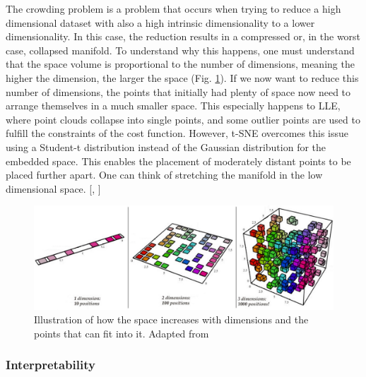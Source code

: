 The crowding problem is a problem that occurs when trying to reduce a high dimensional dataset with 
also a high intrinsic dimensionality to a lower dimensionality. In this case, the reduction results in a compressed or, in the worst case, collapsed manifold. To understand why this happens, one must understand that the space volume is proportional to the number of dimensions, meaning the higher the dimension, the larger the space (Fig. \ref{fig:crowding_problem}). If we now want to reduce this number of dimensions, the points that initially had plenty of space now need to arrange themselves in a much smaller space. This especially happens to LLE, where point clouds collapse into single points, and some outlier points are used to fulfill the constraints of the cost function. However, t-SNE overcomes this issue using a Student-t distribution instead of the Gaussian distribution for the embedded space. This enables the placement of moderately distant points to be placed further apart. One can think of stretching the manifold in the low dimensional space. [\cite{t-SNE08}, \cite{Gisbrecht15}]
\begin{figure}[!]
	\centering
	\includegraphics[width=1\columnwidth]{images/crowding_problem.jpg}
	\caption[Crowding Problem]{Illustration of how the space increases with dimensions and the points that can fit into it. Adapted from \footnotemark}
    \label{fig:crowding_problem}
\end{figure}

\subsubsection{Interpretability}

